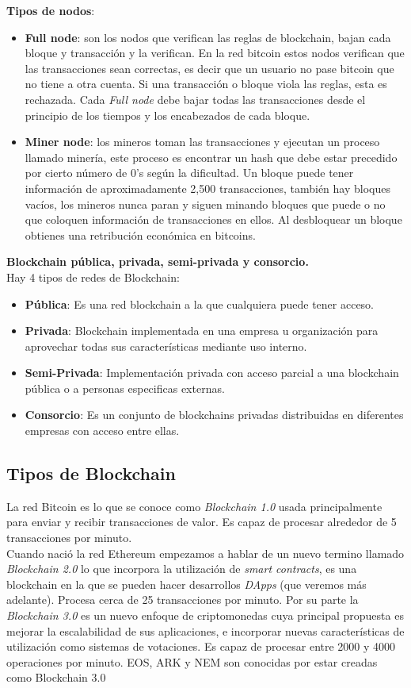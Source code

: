 \documentclass[a4paper,12pt]{/home/armando/Documentos/Cursos/LaTeX/Plantillas/lib/pub}
\begin{document}
\textbf{Tipos de nodos}:
\begin{itemize}
\item \textbf{Full node}: son los nodos que verifican las reglas de blockchain, bajan cada bloque y transacción y la verifican. En la red bitcoin estos nodos verifican que las transacciones sean correctas, es decir que un usuario no pase bitcoin que no tiene a otra cuenta.
Si una transacción o bloque viola las reglas, esta es rechazada.
Cada \textit{Full node} debe bajar todas las transacciones desde el principio de los tiempos y los encabezados de cada bloque.

\item \textbf{Miner node}: los mineros toman las transacciones y ejecutan un proceso llamado minería, este proceso es encontrar un hash que debe estar precedido por cierto número de 0's según la dificultad. Un bloque puede tener información de aproximadamente 2,500 transacciones, también hay bloques vacíos, los mineros nunca paran y siguen minando bloques que puede o no que coloquen información de transacciones en ellos. Al desbloquear un bloque obtienes una retribución económica en bitcoins.\\
\end{itemize}

\textbf{Blockchain pública, privada, semi-privada y consorcio.}\\

Hay 4 tipos de redes de Blockchain:
\begin{itemize}
\item \textbf{Pública}: Es una red blockchain a la que cualquiera puede tener acceso.
\item  \textbf{Privada}: Blockchain implementada en una empresa u organización para aprovechar todas sus características mediante uso interno.
\item \textbf{Semi-Privada}: Implementación privada con acceso parcial a una blockchain pública o a personas especificas externas.
\item \textbf{Consorcio}: Es un conjunto de blockchains privadas distribuidas en diferentes empresas con acceso entre ellas.
\end{itemize}
\newpage
\subsection{Tipos de Blockchain}
La red Bitcoin es lo que se conoce como \textit{Blockchain 1.0} usada principalmente para enviar y recibir transacciones de valor. Es capaz de procesar alrededor de 5 transacciones por minuto.\\
Cuando nació la red Ethereum empezamos a hablar de un nuevo termino llamado \textit{Blockchain 2.0} lo que incorpora la utilización de \textit{smart contracts}, es una blockchain en la que se pueden hacer desarrollos \textit{DApps} (que veremos más adelante). Procesa cerca de 25 transacciones por minuto.
Por su parte la \textit{Blockchain 3.0} es un nuevo enfoque de criptomonedas cuya principal propuesta es mejorar la escalabilidad de sus aplicaciones, e incorporar nuevas características de utilización como sistemas de votaciones. Es capaz de procesar entre 2000 y 4000 operaciones por minuto. EOS, ARK y NEM son conocidas por estar creadas como Blockchain 3.0
\end{document}
